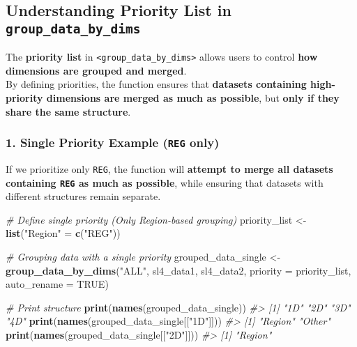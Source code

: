 \documentclass[
]{article}
\newenvironment{Shaded}{\begin{snugshade}}{\end{snugshade}}
\newcommand{\AttributeTok}[1]{\textcolor[rgb]{0.13,0.29,0.53}{#1}}
\newcommand{\CommentTok}[1]{\textcolor[rgb]{0.56,0.35,0.01}{\textit{#1}}}
\newcommand{\ConstantTok}[1]{\textcolor[rgb]{0.56,0.35,0.01}{#1}}
\newcommand{\FunctionTok}[1]{\textcolor[rgb]{0.13,0.29,0.53}{\textbf{#1}}}
\newcommand{\NormalTok}[1]{#1}
\newcommand{\OtherTok}[1]{\textcolor[rgb]{0.56,0.35,0.01}{#1}}
\newcommand{\StringTok}[1]{\textcolor[rgb]{0.31,0.60,0.02}{#1}}
\begin{document}
\subsection{\texorpdfstring{\textbf{Understanding Priority List in
\texttt{group\_data\_by\_dims}}}{Understanding Priority List in group\_data\_by\_dims}}\label{understanding-priority-list-in-group_data_by_dims}

The \textbf{priority list} in
\texttt{\textless{}group\_data\_by\_dims\textgreater{}} allows users to
control \textbf{how dimensions are grouped and merged}.\\
By defining priorities, the function ensures that \textbf{datasets
containing high-priority dimensions are merged as much as possible}, but
\textbf{only if they share the same structure}.

\subsubsection{\texorpdfstring{\textbf{1. Single Priority Example
(\texttt{REG}
only)}}{1. Single Priority Example (REG only)}}\label{single-priority-example-reg-only}

If we prioritize only \texttt{REG}, the function will \textbf{attempt to
merge all datasets containing \texttt{REG} as much as possible}, while
ensuring that datasets with different structures remain separate.

\begin{Shaded}
\begin{Highlighting}[]
\CommentTok{\# Define single priority (Only Region{-}based grouping)}
\NormalTok{priority\_list }\OtherTok{\textless{}{-}} \FunctionTok{list}\NormalTok{(}\StringTok{"Region"} \OtherTok{=} \FunctionTok{c}\NormalTok{(}\StringTok{"REG"}\NormalTok{))}

\CommentTok{\# Grouping data with a single priority}
\NormalTok{grouped\_data\_single }\OtherTok{\textless{}{-}} \FunctionTok{group\_data\_by\_dims}\NormalTok{(}\StringTok{"ALL"}\NormalTok{, sl4\_data1, sl4\_data2,}
                                          \AttributeTok{priority =}\NormalTok{ priority\_list, }\AttributeTok{auto\_rename =} \ConstantTok{TRUE}\NormalTok{)}

\CommentTok{\# Print structure}
\FunctionTok{print}\NormalTok{(}\FunctionTok{names}\NormalTok{(grouped\_data\_single))}
\CommentTok{\#\textgreater{} [1] "1D" "2D" "3D" "4D"}
\FunctionTok{print}\NormalTok{(}\FunctionTok{names}\NormalTok{(grouped\_data\_single[[}\StringTok{"1D"}\NormalTok{]]))}
\CommentTok{\#\textgreater{} [1] "Region" "Other"}
\FunctionTok{print}\NormalTok{(}\FunctionTok{names}\NormalTok{(grouped\_data\_single[[}\StringTok{"2D"}\NormalTok{]]))}
\CommentTok{\#\textgreater{} [1] "Region"}
\end{Highlighting}
\end{Shaded}
\end{document}
